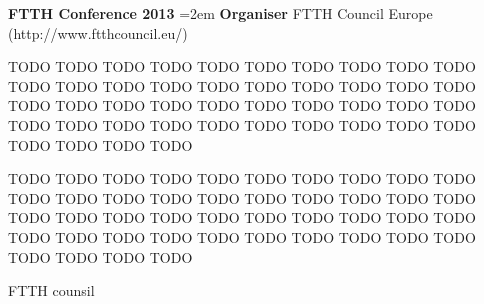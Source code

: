 \textbf{FTTH Conference 2013}
\hangindent=2em
\textbf{Organiser}
FTTH Council Europe (http://www.ftthcouncil.eu/)

TODO TODO TODO TODO TODO TODO TODO TODO TODO TODO TODO TODO TODO TODO TODO TODO TODO TODO TODO TODO TODO TODO TODO TODO TODO TODO TODO TODO TODO TODO TODO TODO TODO TODO TODO TODO TODO TODO TODO TODO TODO TODO TODO TODO 

TODO TODO TODO TODO TODO TODO TODO TODO TODO TODO TODO TODO TODO TODO TODO TODO TODO TODO TODO TODO TODO TODO TODO TODO TODO TODO TODO TODO TODO TODO TODO TODO TODO TODO TODO TODO TODO TODO TODO TODO TODO TODO TODO TODO 




FTTH counsil

